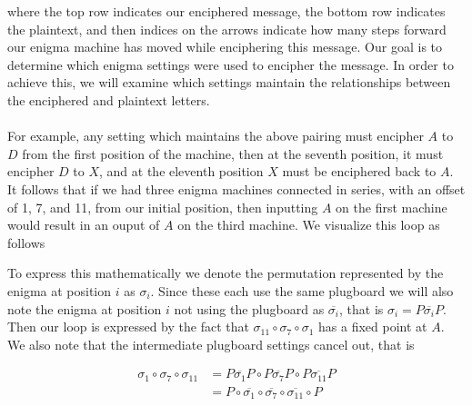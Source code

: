     where the top row indicates our enciphered message, the bottom row indicates the plaintext,
    and then indices on the arrows indicate how many steps forward our enigma machine has moved while enciphering this message.
    Our goal is to determine which enigma settings were used to encipher the message.  In order to achieve this, 
    we will examine which settings maintain the relationships between the enciphered and plaintext letters. 
    \\\\For example, any setting which maintains the above pairing must encipher $A$ to $D$ from the first position of the machine, then at 
    the seventh position, it must encipher $D$ to $X$, and at the eleventh position $X$ must be enciphered back to $A$. It follows that if we had 
    three enigma machines connected in series, with an offset of 1, 7, and 11, from our initial position, then inputting $A$ on the first machine would result in an ouput of $A$ on the
    third machine. We visualize this loop as follows 
    \begin{center}
    \end{center}
    To express this mathematically we denote the permutation represented by the enigma at 
    position $i$ as $\sigma_i$. Since these each use the same plugboard we will also note the 
    enigma at position $i$ not using the plugboard as $\overline{\sigma_i}$, that is $\sigma_i = P\overline{\sigma_i}P$.
    Then our loop is expressed by the fact that $\sigma_{11}\circ\sigma_7\circ\sigma_1$ has a fixed point at $A$. 
    We also note that the intermediate plugboard settings cancel out, that is 
    \begin{center}
        \begin{align*}
            \sigma_{1}\circ\sigma_7\circ\sigma_{11} &= P\overline{\sigma_{1}}P\circ P\overline{\sigma_7}P\circ P\overline{\sigma_{11}}P
            \\&= P\circ \overline{\sigma_{1}}\circ\overline{\sigma_7}\circ\overline{\sigma_{11}}\circ P
        \end{align*}
    \end{center}
